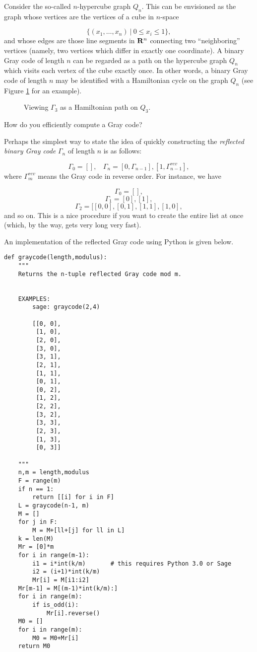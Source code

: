 Consider the so-called $n$-hypercube graph
$Q_n$. This can be envisioned as the graph whose
vertices are the vertices of a cube in
$n$-space

\[
\{(x_1,\dots,x_n)\ |\ 0\leq x_i\leq 1\},
\]
and whose edges are those line segments in
$\mathbf{R}^n$ connecting two ``neighboring''
vertices (namely, two vertices which differ
in exactly one coordinate).
A binary Gray code of length $n$ can be regarded as a
path on the hypercube graph $Q_n$ which visits
each vertex of the cube exactly once.
In other words, a binary Gray code of length $n$
may be identified with a
Hamiltonian cycle on the graph $Q_n$
(see Figure \ref{fig:trees_forests:gray_code_cube} for an example).

\begin{figure}[!htbp]
\centering

\caption{Viewing $\Gamma_3$ as a Hamiltonian path on $Q_3$.}
\label{fig:trees_forests:gray_code_cube}
\end{figure}


How do you efficiently compute a Gray code?

Perhaps the simplest way to state the idea of
quickly constructing
the {\it reflected binary Gray code} $\Gamma_n$
of length $n$ is as follows:

\[
\Gamma_0=[],\ \ \ \
\Gamma_{n}=[0,\Gamma_{n-1}],[1,\Gamma_{n-1}^{rev}],
\]
where $\Gamma_m^{rev}$ means the Gray code in
reverse order. For instance, we have

\[
\Gamma_0=[],
\]
\[
\Gamma_1 = [0], [1],
\]
\[
\Gamma_2=[[0,0],[0,1],[1,1],[1,0],
\]
and so on. This is a nice procedure if you want to create
the entire list at once (which, by the way, gets very long
very fast).

An implementation of the reflected Gray code using Python is given below.

\begin{lstlisting}
def graycode(length,modulus):
    """
    Returns the n-tuple reflected Gray code mod m.


    EXAMPLES:
        sage: graycode(2,4)

        [[0, 0],
         [1, 0],
         [2, 0],
         [3, 0],
         [3, 1],
         [2, 1],
         [1, 1],
         [0, 1],
         [0, 2],
         [1, 2],
         [2, 2],
         [3, 2],
         [3, 3],
         [2, 3],
         [1, 3],
         [0, 3]]

    """
    n,m = length,modulus
    F = range(m)
    if n == 1:
        return [[i] for i in F]
    L = graycode(n-1, m)
    M = []
    for j in F:
        M = M+[ll+[j] for ll in L]
    k = len(M)
    Mr = [0]*m
    for i in range(m-1):
        i1 = i*int(k/m)       # this requires Python 3.0 or Sage
        i2 = (i+1)*int(k/m)
        Mr[i] = M[i1:i2]
    Mr[m-1] = M[(m-1)*int(k/m):]
    for i in range(m):
        if is_odd(i):
            Mr[i].reverse()
    M0 = []
    for i in range(m):
        M0 = M0+Mr[i]
    return M0
\end{lstlisting}

